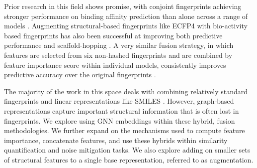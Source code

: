 
Prior research in this field shows promise, with conjoint fingerprints achieving stronger performance on binding affinity prediction than alone across a range of models \citep{Xie2020}. Augmenting structural-based fingerprints like ECFP4 with bio-activity based fingerprints has also been successful at improving both predictive performance and scaffold-hopping \citep{Laufktter2019}. A very similar fusion strategy, in which features are selected from six non-hashed fingerprints and are combined by feature importance score within individual models, consistently improves predictive accuracy over the original fingerprints \citep{Turkina2025}. 

The majority of the work in this space deals with combining relatively standard fingerprints and linear representations like SMILES \citep{Xie2020, Laufktter2019}. However, graph-based representations capture important structural information that is often lost in fingerprints. We explore using GNN embeddings within these hybrid, fusion methodologies. We further expand on the mechanisms used to compute feature importance, concatenate features, and use these hybrids within similarity quantification and noise mitigation tasks. We also explore adding on smaller sets of structural features to a single base representation, referred to as augmentation. 

